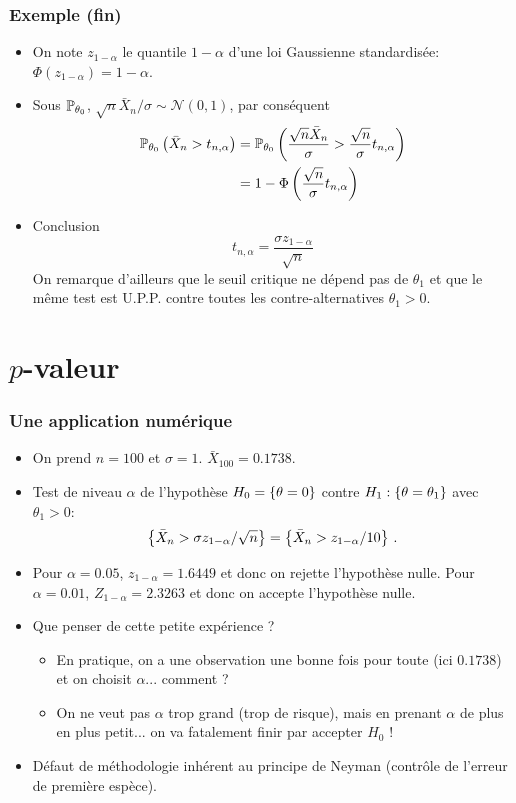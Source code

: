 \begin{frame}
\frametitle{Exemple (fin)}
\begin{itemize}
\item On note $z_{1-\alpha}$ le quantile $1-\alpha$ d'une loi Gaussienne standardisée: $\Phi(z_{1-\alpha})= 1-\alpha$.
\item Sous $\operatorname{{\mathbb P}}_{\theta_0}$, $\sqrt{n} \bar{X}_n/\sigma \sim \mathcal{N}(0,1)$, par conséquent
\begin{align*}
\operatorname{{\mathbb P}}_{\theta_0} \left( \bar{X}_n > t_{n,\alpha} \right) &= \operatorname{{\mathbb P}}_{\theta_0} \left( \frac{\sqrt{n} \bar{X}_n}{\sigma} > \frac{\sqrt{n}}{\sigma} t_{n,\alpha} \right) \\
&= 1 - \Phi \left( \frac{\sqrt{n}}{\sigma} t_{n,\alpha} \right)
\end{align*}
\item \alert{Conclusion}
\[
t_{n,\alpha}= \frac{\sigma z_{1-\alpha}}{\sqrt{n}}
\]
On remarque d'ailleurs que le \alert{seuil critique} ne \alert{dépend pas de $\theta_1$} et que le \alert{même} test est U.P.P. contre toutes les contre-alternatives $\theta_1 > 0$.
\end{itemize}
\end{frame}



\section{$p$-valeur}
\begin{frame}
\frametitle{Une application numérique}
\begin{itemize}
\item On prend $n=100$ et $\sigma=1$.  $\bar{X}_{100}= 0.1738$.
\item Test de niveau $\alpha$ de l'hypothèse $H_0= \{ \theta= 0 \}$ contre $H_1: \{\theta= \theta_1 \}$ avec $\theta_1 > 0$:
\[
\left\{ \bar{X}_n > \sigma z_{1-\alpha}/ \sqrt{n} \right\}= \left\{ \bar{X}_n > z_{1-\alpha}/10 \right\} \,.
\]
\item Pour $\alpha =0.05$, $z_{1-\alpha}= 1.6449$ et donc on \alert{rejette} l'hypothèse nulle. Pour $\alpha= 0.01$, $Z_{1-\alpha}= 2.3263$ et donc on \alert{accepte} l'hypothèse nulle.
\item Que penser de cette petite expérience ?
\begin{itemize}
\item En pratique, on a une observation une bonne fois pour toute (ici $0.1738$) et on  choisit  $\alpha$... \alert{comment ?}
\item On ne veut pas $\alpha$ trop grand (trop de risque), mais en prenant $\alpha$ de plus en plus petit... on va \alert{ fatalement} finir par accepter $H_0$ !
\end{itemize}
\item Défaut de méthodologie inhérent au principe de Neyman (contrôle de l'erreur de première espèce).
\end{itemize}
\end{frame}


